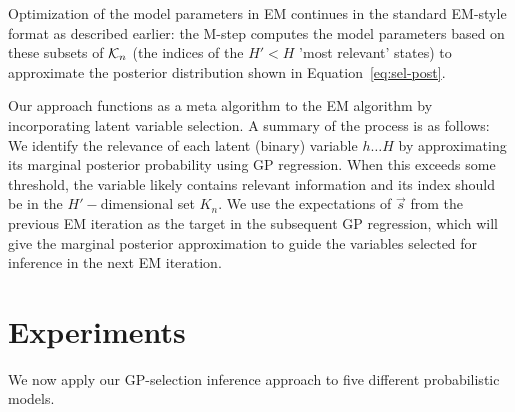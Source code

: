 %

Optimization of the model parameters in EM continues in the standard EM-style format as described earlier: the
M-step computes the model parameters based on these subsets of $\mathcal{K}_{n}$ 
(the indices of the $H' < H$ 'most relevant' states) 
to approximate the posterior distribution shown in Equation~\eqref{eq:sel-post}.

Our approach functions as a meta algorithm to the EM algorithm by incorporating latent variable selection.
A summary of the process is as follows:
We identify the relevance of each latent (binary) variable $h\dots H$ by approximating its marginal posterior probability using GP regression. 
When this exceeds some threshold, the variable likely contains relevant information and its index should be in the $H'-$dimensional set $K_n$.
We use the expectations of $\vec{s}$ from the previous EM iteration as the target in the subsequent GP regression, which will give the marginal posterior approximation to guide the variables selected for inference in the next EM iteration.


\section{Experiments}
\label{exps}
%
We now apply our GP-selection inference approach to five different probabilistic models.

